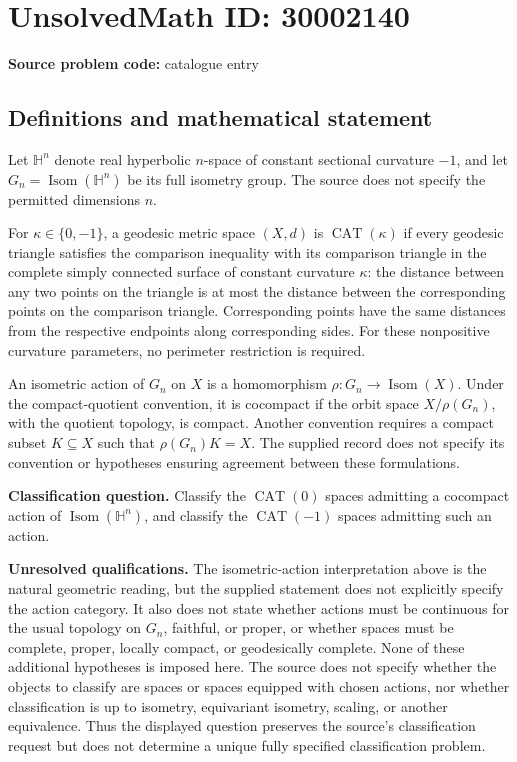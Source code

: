 \documentclass[11pt]{article}
\begin{document}
\section*{UnsolvedMath ID: 30002140}
\textbf{Source problem code:} catalogue entry
\subsection{Definitions and mathematical statement}
Let \(\mathbb H^n\) denote real hyperbolic \(n\)-space of constant sectional curvature \(-1\), and let \(G_n=\operatorname{Isom}(\mathbb H^n)\) be its full isometry group. The source does not specify the permitted dimensions \(n\).

For \(\kappa\in\{0,-1\}\), a geodesic metric space \((X,d)\) is \(\operatorname{CAT}(\kappa)\) if every geodesic triangle satisfies the comparison inequality with its comparison triangle in the complete simply connected surface of constant curvature \(\kappa\): the distance between any two points on the triangle is at most the distance between the corresponding points on the comparison triangle. Corresponding points have the same distances from the respective endpoints along corresponding sides. For these nonpositive curvature parameters, no perimeter restriction is required.

An isometric action of \(G_n\) on \(X\) is a homomorphism \(\rho:G_n\to\operatorname{Isom}(X)\). Under the compact-quotient convention, it is cocompact if the orbit space \(X/\rho(G_n)\), with the quotient topology, is compact. Another convention requires a compact subset \(K\subseteq X\) such that \(\rho(G_n)K=X\). The supplied record does not specify its convention or hypotheses ensuring agreement between these formulations.

\textbf{Classification question.} Classify the \(\operatorname{CAT}(0)\) spaces admitting a cocompact action of \(\operatorname{Isom}(\mathbb H^n)\), and classify the \(\operatorname{CAT}(-1)\) spaces admitting such an action.

\textbf{Unresolved qualifications.} The isometric-action interpretation above is the natural geometric reading, but the supplied statement does not explicitly specify the action category. It also does not state whether actions must be continuous for the usual topology on \(G_n\), faithful, or proper, or whether spaces must be complete, proper, locally compact, or geodesically complete. None of these additional hypotheses is imposed here. The source does not specify whether the objects to classify are spaces or spaces equipped with chosen actions, nor whether classification is up to isometry, equivariant isometry, scaling, or another equivalence. Thus the displayed question preserves the source's classification request but does not determine a unique fully specified classification problem.
\end{document}
